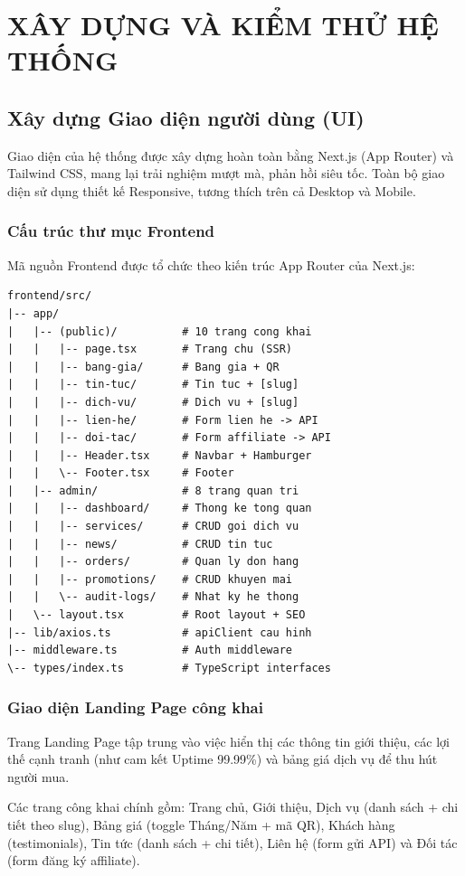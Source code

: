 \chapter{XÂY DỰNG VÀ KIỂM THỬ HỆ THỐNG}

\section{Xây dựng Giao diện người dùng (UI)}
Giao diện của hệ thống được xây dựng hoàn toàn bằng Next.js (App Router) và Tailwind CSS, mang lại trải nghiệm mượt mà, phản hồi siêu tốc. Toàn bộ giao diện sử dụng thiết kế Responsive, tương thích trên cả Desktop và Mobile.

\subsection{Cấu trúc thư mục Frontend}
Mã nguồn Frontend được tổ chức theo kiến trúc App Router của Next.js:

\begin{verbatim}
frontend/src/
|-- app/
|   |-- (public)/          # 10 trang cong khai
|   |   |-- page.tsx       # Trang chu (SSR)
|   |   |-- bang-gia/      # Bang gia + QR
|   |   |-- tin-tuc/       # Tin tuc + [slug]
|   |   |-- dich-vu/       # Dich vu + [slug]
|   |   |-- lien-he/       # Form lien he -> API
|   |   |-- doi-tac/       # Form affiliate -> API
|   |   |-- Header.tsx     # Navbar + Hamburger
|   |   \-- Footer.tsx     # Footer
|   |-- admin/             # 8 trang quan tri
|   |   |-- dashboard/     # Thong ke tong quan
|   |   |-- services/      # CRUD goi dich vu
|   |   |-- news/          # CRUD tin tuc
|   |   |-- orders/        # Quan ly don hang
|   |   |-- promotions/    # CRUD khuyen mai
|   |   \-- audit-logs/    # Nhat ky he thong
|   \-- layout.tsx         # Root layout + SEO
|-- lib/axios.ts           # apiClient cau hinh
|-- middleware.ts          # Auth middleware
\-- types/index.ts         # TypeScript interfaces
\end{verbatim}

\subsection{Giao diện Landing Page công khai}
Trang Landing Page tập trung vào việc hiển thị các thông tin giới thiệu, các lợi thế cạnh tranh (như cam kết Uptime 99.99\%) và bảng giá dịch vụ để thu hút người mua.

Các trang công khai chính gồm: Trang chủ, Giới thiệu, Dịch vụ (danh sách + chi tiết theo slug), Bảng giá (toggle Tháng/Năm + mã QR), Khách hàng (testimonials), Tin tức (danh sách + chi tiết), Liên hệ (form gửi API) và Đối tác (form đăng ký affiliate).

